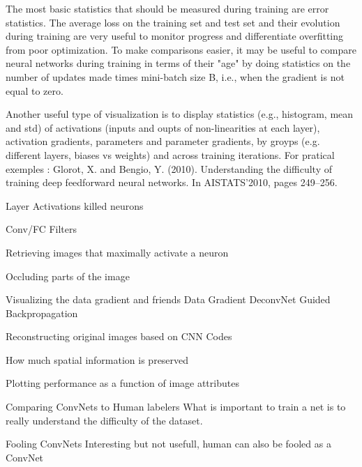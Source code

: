 The most basic statistics that should be measured during training are error statistics. The average loss on the training set and test set and their evolution during training are very useful to monitor progress and differentiate overfitting from poor optimization. To make comparisons easier, it may be useful to compare neural networks during training in terms of their "age" by doing statistics on the number of updates made times mini-batch size B, i.e., when the gradient is not equal to zero.

Another useful type of visualization is to display statistics (e.g., histogram, mean and std) of activations (inputs and oupts of non-linearities at each layer), activation gradients, parameters and parameter gradients, by groyps (e.g. different layers, biases vs weights) and across training iterations.
For pratical exemples :
Glorot, X. and Bengio, Y. (2010). Understanding the difficulty of training deep feedforward neural networks. In AISTATS’2010, pages 249–256.



Layer Activations
 killed neurons
 
Conv/FC Filters

Retrieving images that maximally activate a neuron

Occluding parts of the image

Visualizing the data gradient and friends
Data Gradient
DeconvNet
Guided Backpropagation

Reconstructing original images based on CNN Codes

How much spatial information is preserved

Plotting performance as a function of image attributes

Comparing ConvNets to Human labelers
What is important to train a net is to really understand the difficulty of the dataset.

Fooling ConvNets
Interesting but not usefull, human can also be fooled as a ConvNet